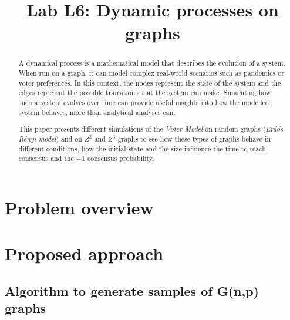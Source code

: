\documentclass[conference]{IEEEtran}
\begin{document}
\title{
Lab L6: Dynamic processes on graphs
}

\author{
}

\maketitle
\begin{abstract}
A dynamical process is a mathematical model that describes the evolution of a system.
%
When run on a graph, it can model complex real-world scenarios such as pandemics or voter preferences.
%
In this context, the nodes represent the state of the system and the edges represent the possible transitions that the system can make. 
%
Simulating how such a system evolves over time can provide useful insights into how the modelled system behaves, more than analytical analyses can. 

This paper presents different simulations of the \textit{Voter Model} on random graphs (\textit{Erdős-Rényi model}) and on $Z^2$ and $Z^3$ graphs to see how these types of graphs behave in different conditions, how the initial state and the size influence the time to reach consensus and the +1 consensus probability.

\end{abstract}

\section{Problem overview}

%
%
%

\section{Proposed approach}

    \subsection{Algorithm to generate samples of G(n,p) graphs}
\end{document}
